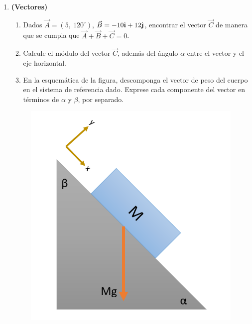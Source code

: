\documentclass[letterpaper,11pt]{article}
\newcommand{\ihat}{\hat{\textbf{\i}}}
\newcommand{\jhat}{\hat{\textbf{\j}}}
\begin{document}
\begin{enumerate}
\begin{multicols}{2}
\end{multicols}

\item \textbf{(Vectores)}

\begin{multicols}{2}

\begin{enumerate}
    \item Dados $\Vec{A} = (5, \ 120^{\circ})$, $\Vec{B} = -10 \ihat + 12 \jhat$, encontrar el vector $\Vec{C}$ de manera que se cumpla que $\Vec{A} + \Vec{B} + \Vec{C} = 0$.

    \item Calcule el módulo del vector $\Vec{C}$, además del ángulo $\alpha$ entre el vector y el eje horizontal.

    \item En la esquemática de la figura, descomponga el vector de peso del cuerpo en el sistema de referencia dado. Exprese cada componente del vector en términos de $\alpha$ y $\beta$, por separado.
\end{enumerate}

    \columnbreak
    
    \begin{figure}[H]
        \centering
        \includegraphics[width=0.6\linewidth]{2022-2/Imagenes/Taller3/p2.png}
    \end{figure}
    
\end{multicols}


%   

\end{enumerate}
\end{document}
